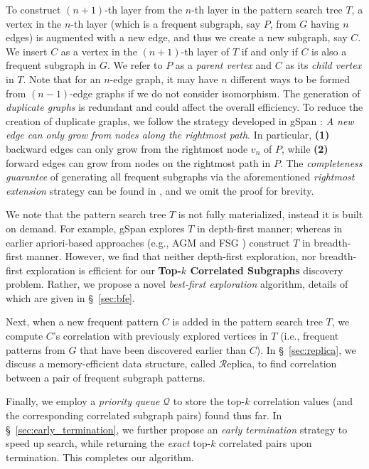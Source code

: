 To construct $(n+1)$-th layer from the $n$-th layer in the pattern search tree
$T$, a vertex in the $n$-th layer (which is a frequent subgraph, say $P$, from
$G$ having $n$ edges) is augmented with a new edge, and thus we create a new
subgraph, say $C$. We insert $C$ as a vertex in the $(n+1)$-th layer of $T$ if
and only if $C$ is also a frequent subgraph in $G$. We refer to $P$ as a {\em parent
vertex} and $C$ as its {\em child vertex} in $T$. Note that for an $n$-edge
graph, it may have $n$ different ways to be formed from $(n-1)$-edge graphs if
we do not consider isomorphism. The generation of {\em duplicate graphs} is
redundant and could affect the overall efficiency. To reduce the creation of
duplicate graphs, we follow the strategy developed in gSpan \cite{YH02}: {\em A
new edge can only grow from nodes along the rightmost path}. In
particular, {\bf (1)} backward edges can only grow from the rightmost node $v_n$
of $P$, while {\bf (2)} forward edges can grow from nodes on the rightmost path in
$P$. The {\em completeness guarantee} of generating all frequent subgraphs via
the aforementioned {\em rightmost extension} strategy can be found in
\cite{YH02}, and we omit the proof for brevity.

We note that the pattern search tree $T$ is not fully materialized, instead it
is built on demand. For example, gSpan \cite{YH02} explores $T$ in depth-first
manner; whereas in earlier apriori-based approaches (e.g., AGM \cite{IWM00} and
FSG \cite{KK01}) construct $T$ in breadth-first manner. However, we find that
neither depth-first exploration, nor breadth-first exploration is efficient for
our {\bf Top-$k$ Correlated Subgraphs} discovery problem. Rather, we propose a
novel {\em best-first exploration} algorithm, details of which are given in
\S~\ref{sec:bfe}.

Next, when a new frequent pattern $C$ is added in the pattern search tree $T$,
we compute $C$'s correlation with previously explored vertices in $T$ (i.e.,
frequent patterns from $G$ that have been discovered earlier than $C$). In
\S~\ref{sec:replica}, we discuss a memory-efficient data structure,
called $\mathcal{R}$eplica, to find correlation between a pair of frequent
subgraph patterns.

Finally, we employ a {\em priority queue} $\mathcal{Q}$ to store the top-$k$
correlation values (and the corresponding correlated subgraph pairs) found thus
far. In \S~\ref{sec:early_termination}, we further propose an {\em early
termination} strategy to speed up search, while returning the {\em
exact} top-$k$ correlated pairs upon termination.
This completes our algorithm.
%
